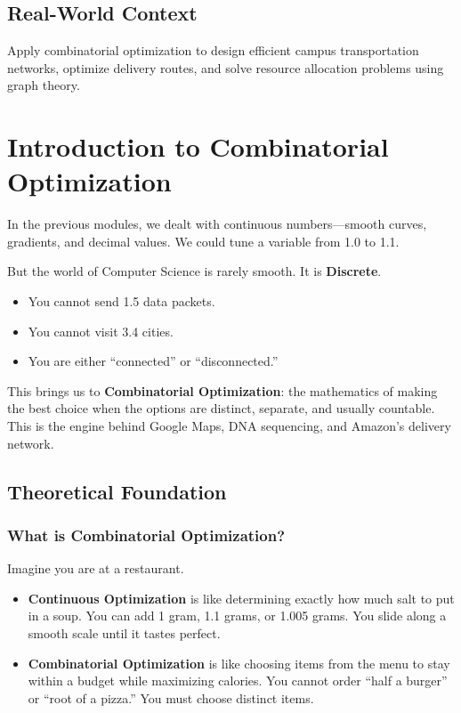 \documentclass[
  letterpaper,
  DIV=11,
  numbers=noendperiod]{scrreprt}
\providecommand{\tightlist}{%
  \setlength{\itemsep}{0pt}\setlength{\parskip}{0pt}}
\begin{document}
\subsection{Real-World Context}\label{real-world-context-2}

Apply combinatorial optimization to design efficient campus
transportation networks, optimize delivery routes, and solve resource
allocation problems using graph theory.

\section{Introduction to Combinatorial
Optimization}\label{introduction-to-combinatorial-optimization}

In the previous modules, we dealt with continuous numbers---smooth
curves, gradients, and decimal values. We could tune a variable from 1.0
to 1.1.

But the world of Computer Science is rarely smooth. It is
\textbf{Discrete}.

\begin{itemize}
\tightlist
\item
  You cannot send 1.5 data packets.
\item
  You cannot visit 3.4 cities.
\item
  You are either ``connected'' or ``disconnected.''
\end{itemize}

This brings us to \textbf{Combinatorial Optimization}: the mathematics
of making the best choice when the options are distinct, separate, and
usually countable. This is the engine behind Google Maps, DNA
sequencing, and Amazon's delivery network.

\subsection{Theoretical Foundation}\label{theoretical-foundation-8}

\subsubsection{What is Combinatorial
Optimization?}\label{what-is-combinatorial-optimization}

Imagine you are at a restaurant.

\begin{itemize}
\item
  \textbf{Continuous Optimization} is like determining exactly how much
  salt to put in a soup. You can add 1 gram, 1.1 grams, or 1.005 grams.
  You slide along a smooth scale until it tastes perfect.
\item
  \textbf{Combinatorial Optimization} is like choosing items from the
  menu to stay within a budget while maximizing calories. You cannot
  order ``half a burger'' or ``root of a pizza.'' You must choose
  distinct items.
\end{itemize}
\end{document}
